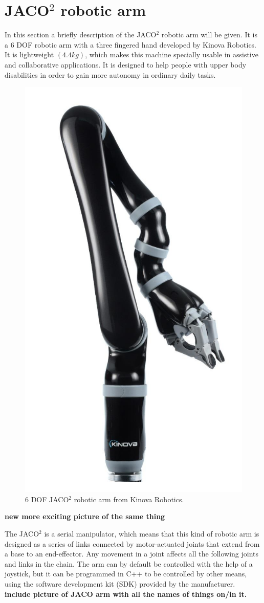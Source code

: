 \section{JACO$^2$ robotic arm}

In this section a briefly description of the JACO$^2$ robotic arm will be given. It is a 6 DOF robotic arm  with a three fingered hand developed by Kinova Robotics. It is lightweight $\left( 4.4 kg\right)$, which makes this machine specially usable in assistive and collaborative applications. It is designed to help people with upper body disabilities in order to gain more autonomy in ordinary daily tasks.\\

\begin{figure}[H]                    
\includegraphics[width=.3\textwidth]{figures/Jaco/roboticarm}  %
\caption{6 DOF JACO$^2$ robotic arm from Kinova Robotics. \cite{kinova2017}}
\label{fig:roboticarm}  %
\end{figure}
\textbf{new more exciting picture of the same thing}

The JACO$^2$ is a serial manipulator, which means that this kind of robotic arm is designed as a series of links connected by motor-actuated joints that extend from a base to an end-effector. Any movement in a joint affects all the following joints and links in the chain. The arm can by default be controlled with the help of a joystick, but it can be programmed in C++ to be controlled by other means, using the software development kit (SDK) provided by the manufacturer.\\

\textbf{include picture of JACO arm with all the names of things on/in it.}



